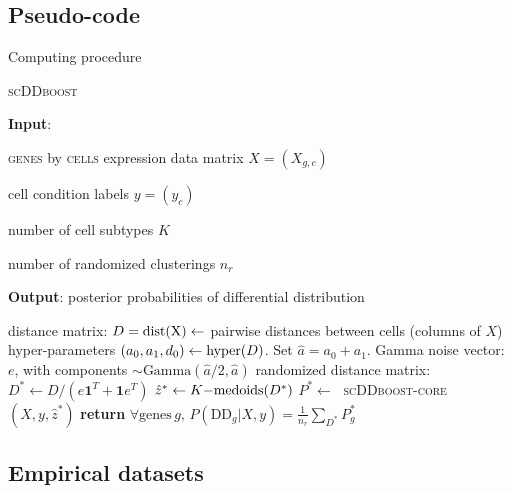 \documentclass[aoas,preprint]{imsart}
\begin{document}
\newpage
\subsection*{Pseudo-code}
Computing procedure
\begin{algorithm}
\caption{\textsc{scDDboost}}\label{alg:scDDboost}
\raggedright\hspace*{\algorithmicindent} \textbf{Input}: \begin{list}{}{}
 \item  \textsc{genes} by \textsc{cells} expression data matrix $X=(X_{g,c})$
 \item  cell condition labels $y=(y_c)$
 \item  number of cell subtypes $K$
 \item number of randomized clusterings $n_r$
 \end{list}
\hspace*{\algorithmicindent} \textbf{Output}: posterior probabilities of differential distribution
\begin{algorithmic}[2]
\State distance matrix: $D=\rm{dist}(X) \gets$ pairwise distances between cells (columns of $X$)
\State hyper-parameters $(a_0, a_1, d_0) \gets {\mbox {\rm hyper}}(D)$. Set $\hat a = a_0 + a_1$.
\Repeat
\State Gamma noise vector: $e$, with components $\sim \text{Gamma}(\hat a/2,\hat a)$
\State randomized distance matrix: $D^* \gets D / (e\textbf{1}^T +  \textbf{1}e^T)$
\State $\hat z^* \gets {\mbox {\rm $K-$medoids}}(D^*)$
\State $P^* \gets\;$ \textsc{scDDboost-core}$(X,y,\hat z^*)$
\State \textbf{return} $\forall \text{genes} \, g, \, P(\text{DD}_g|X,y) = \frac{1}{n_r}
   \sum_{D^*} P^*_g$
\EndProcedure
\end{algorithmic}
\end{algorithm}
\FloatBarrier


\subsection*{Empirical datasets}
\end{document}
